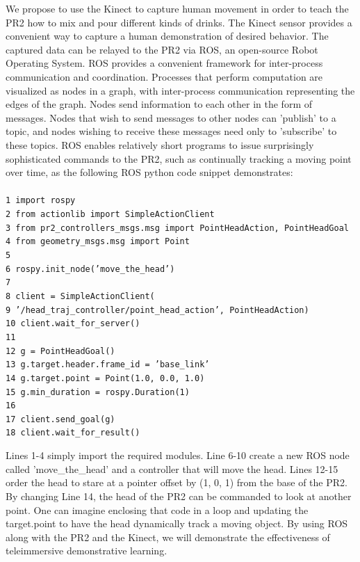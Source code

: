 \documentclass{sig-alternate}
\begin{document}
We propose to use the Kinect to capture human movement in order to teach the PR2 how to mix and pour different kinds of drinks. The Kinect sensor provides a convenient way to capture a human demonstration of desired behavior. The captured data can be relayed to the PR2 via ROS, an open-source Robot Operating System\cite{ros}. ROS provides a convenient framework for inter-process communication and coordination. Processes that perform computation are visualized as nodes in a graph, with inter-process communication representing the edges of the graph. Nodes send information to each other in the form of messages. Nodes that wish to send messages to other nodes can 'publish' to a topic, and nodes wishing to receive these messages need only to 'subscribe' to these topics. ROS enables relatively short programs to issue surprisingly sophisticated commands to the PR2, such as continually tracking a moving point over time, as the following ROS python code snippet demonstrates\cite{ros_pr2}:\\
{\tt \\1 import rospy\\
2 from actionlib import SimpleActionClient\\
3 from pr2\_controllers\_msgs.msg import PointHeadAction, PointHeadGoal\\
4 from geometry\_msgs.msg import Point\\
5\\
6 rospy.init\_node('move\_the\_head')\\
7\\
8 client = SimpleActionClient(\\
9 '/head\_traj\_controller/point\_head\_action', PointHeadAction)\\
10 client.wait\_for\_server()\\
11\\
12 g = PointHeadGoal()\\
13 g.target.header.frame\_id = 'base\_link'\\
14 g.target.point = Point(1.0, 0.0, 1.0)\\
15 g.min\_duration = rospy.Duration(1)\\
16\\
17 client.send\_goal(g)\\
18 client.wait\_for\_result()\\
}

Lines 1-4 simply import the required modules. Line 6-10 create a new ROS node called 'move\_the\_head' and a controller that will move the head. Lines 12-15 order the head to stare at a pointer offset by (1, 0, 1) from the base of the PR2. By changing Line 14, the head of the PR2 can be commanded to look at another point. One can imagine enclosing that code in a loop and updating the target.point to have the head dynamically track a moving object. By using ROS along with the PR2 and the Kinect, we will demonstrate the effectiveness of teleimmersive demonstrative learning.\\
\end{document}
